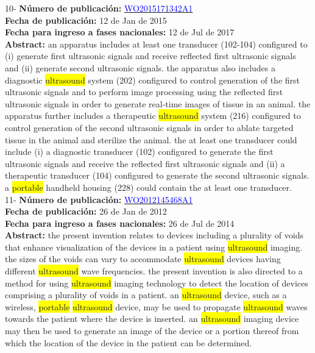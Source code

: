  \vspace{1cm}10- \textbf{Número de publicación:} \href{https://worldwide.espacenet.com/publicationDetails/biblio?DB=EPODOC&II=0&ND=3&adjacent=true&locale=en_EP&FT=D&date=20160331&CC=WO&NR=2015171342A1&KC=A1#}{\textcolor{blue}{WO2015171342A1}}\\ 
\textbf{Fecha de publicación:} 12 de Jan de 2015\\ 
\textbf{Fecha para ingreso a fases nacionales:} 12 de Jul de 2017\\ 
\textbf{Abstract:} an apparatus includes at least one transducer (102-104) configured to (i) generate first ultrasonic signals and receive reflected first ultrasonic signals and (ii) generate second ultrasonic signals. the apparatus also includes a diagnostic \colorbox{yellow}{ultrasound} system (202) configured to control generation of the first ultrasonic signals and to perform image processing using the reflected first ultrasonic signals in order to generate real-time images of tissue in an animal. the apparatus further includes a therapeutic \colorbox{yellow}{ultrasound} system (216) configured to control generation of the second ultrasonic signals in order to ablate targeted tissue in the animal and sterilize the animal. the at least one transducer could include (i) a diagnostic transducer (102) configured to generate the first ultrasonic signals and receive the reflected first ultrasonic signals and (ii) a therapeutic transducer (104) configured to generate the second ultrasonic signals. a \colorbox{yellow}{\colorbox{yellow}{portable}} handheld housing (228) could contain the at least one transducer.\\ 
 

 \vspace{1cm}11- \textbf{Número de publicación:} \href{https://worldwide.espacenet.com/publicationDetails/biblio?DB=EPODOC&II=0&ND=3&adjacent=true&locale=en_EP&FT=D&date=20160331&CC=WO&NR=2012145468A1&KC=A1#}{\textcolor{blue}{WO2012145468A1}}\\ 
\textbf{Fecha de publicación:} 26 de Jan de 2012\\ 
\textbf{Fecha para ingreso a fases nacionales:} 26 de Jul de 2014\\ 
\textbf{Abstract:} the present invention relates to devices including a plurality of voids that enhance visualization of the devices in a patient using \colorbox{yellow}{ultrasound} imaging. the sizes of the voids can vary to accommodate \colorbox{yellow}{ultrasound} devices having different \colorbox{yellow}{ultrasound} wave frequencies. the present invention is also directed to a method for using \colorbox{yellow}{ultrasound} imaging technology to detect the location of devices comprising a plurality of voids in a patient. an \colorbox{yellow}{ultrasound} device, such as a wireless, \colorbox{yellow}{\colorbox{yellow}{portable}} \colorbox{yellow}{ultrasound} device, may be used to propagate \colorbox{yellow}{ultrasound} waves towards the patient where the device is inserted. an \colorbox{yellow}{ultrasound} imaging device may then be used to generate an image of the device or a portion thereof from which the location of the device in the patient can be determined.\\ 
 
